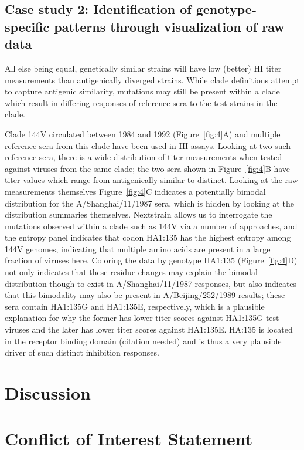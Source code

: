 \documentclass[utf8]{FrontiersinHarvard} %
\begin{document}
\subsection{Case study 2: Identification of genotype-specific patterns through visualization of raw data}

All else being equal, genetically similar strains will have low (better) HI titer measurements than antigenically diverged strains.
While clade definitions attempt to capture antigenic similarity, mutations may still be present within a clade which result in differing responses of reference sera to the test strains in the clade.


Clade 144V circulated between 1984 and 1992 (Figure~\ref{fig:4}A) and multiple reference sera from this clade have been used in HI assays.
Looking at two such reference sera, there is a wide distribution of titer measurements when tested against viruses from the same clade; the two sera shown in Figure~\ref{fig:4}B have titer values which range from antigenically similar to distinct.
Looking at the raw measurements themselves Figure~\ref{fig:4}C indicates a potentially bimodal distribution for the A/Shanghai/11/1987 sera, which is hidden by looking at the distribution summaries themselves.
Nextstrain allows us to interrogate the mutations observed within a clade such as 144V via a number of approaches, and the entropy panel indicates that codon HA1:135 has the highest entropy among 144V genomes, indicating that multiple amino acids are present in a large fraction of viruses here. 
Coloring the data by genotype HA1:135 (Figure~\ref{fig:4}D) not only indicates that these residue changes may explain the bimodal distribution though to exist in A/Shanghai/11/1987 responses, but also indicates that this bimodality may also be present in A/Beijing/252/1989 results; these sera contain HA1:135G and HA1:135E, respectively, which is a plausible explanation for why the former has lower titer scores against HA1:135G test viruses and the later has lower titer scores against HA1:135E.
HA:135 is located in the receptor binding domain (citation needed) and is thus a very plausible driver of such distinct inhibition responses.


\section{Discussion}

\section*{Conflict of Interest Statement}
\end{document}
